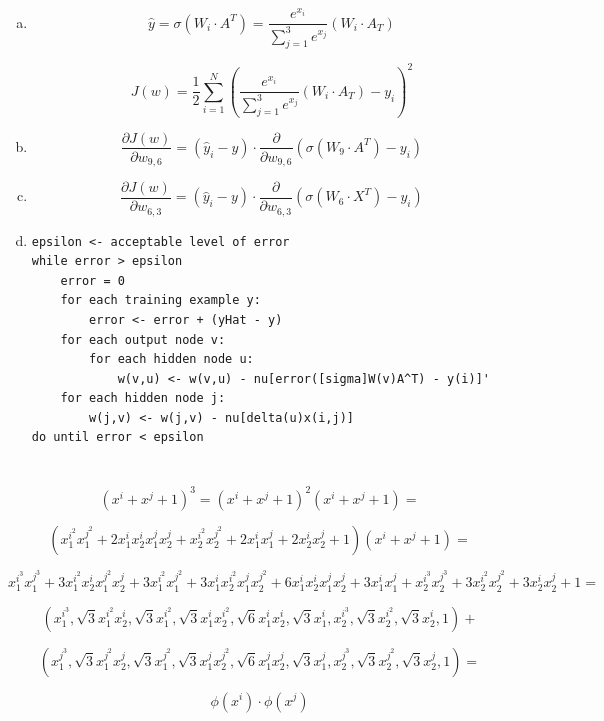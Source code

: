 \documentclass{article}
\begin{document}
\section{}
\begin{enumerate}[(a)]
\item
\[
\hat{y} = \sigma(W_i \cdot A^T) = \frac{e^{x_i}}{\sum_{j=1}^{3}e^{x_j}}
(W_i \cdot A_T)
\]

\[
J(w) = \frac{1}{2}\sum_{i=1}^N(\frac{e^{x_i}}{\sum_{j=1}^{3}e^{x_j}}
(W_i \cdot A_T) - y_i)^2
\]

\item
\[
\frac{\partial J(w)}{\partial w_{9,6}} =
(\hat y_i - y) \cdot \frac{\partial}{\partial w_{9,6}}
(\sigma(W_9 \cdot A^T) - y_i)
\]

\item
\[
\frac{\partial J(w)}{\partial w_{6,3}} =
(\hat y_i - y) \cdot \frac{\partial}{\partial w_{6,3}}
(\sigma(W_6 \cdot X^T) - y_i)
\]

\item
\begin{verbatim}
epsilon <- acceptable level of error
while error > epsilon
    error = 0
    for each training example y:
        error <- error + (yHat - y)
    for each output node v:
        for each hidden node u:
            w(v,u) <- w(v,u) - nu[error([sigma]W(v)A^T) - y(i)]'
    for each hidden node j:
        w(j,v) <- w(j,v) - nu[delta(u)x(i,j)]
do until error < epsilon
\end{verbatim} 

\end{enumerate}
\section{}
\[
(x^i + x^j + 1)^3 = (x^i + x^j + 1)^2(x^i + x^j + 1) =
\]

\[
(x^{i^2}_1x^{j^2}_1 + 2x^i_1x^i_2x^j_1x^j_2+x^{i^2}_2 x^{j^2}_2+ 2x^i_1x^j_1 
+ 2x^i_2x^j_2 +1)(x^i + x^j + 1) =
\]

\[
x^{i^3}_1x^{j^3}_1 + 3x^{i^2}_1 x^i_2 x^{j^2}_1 x^j_2 + 3x^{i^2}_1x^{j^2}_1 +
3x^i_1 x^{i^2}_2 x^j_1 x^{j^2}_2 + 6 x^i_1 x^i_2 x^j_1 x^j_2 + 3 x^i_1 x^j_1
+ x^{i^3}_2x^{j^3}_2 + 3x^{i^2}_2x^{j^2}_2 + 3 x^i_2 x^j_2 + 1 = 
\]

\[
(x^{i^3}_1, \sqrt{3}x^{i^2}_1 x^i_2, \sqrt{3}x^{i^2}_1,
\sqrt{3}x^i_1 x^{i^2}_2, \sqrt{6} x^i_1 x^i_2, \sqrt{3} x^i_1,
x^{i^3}_2, \sqrt{3}x^{i^2}_2, \sqrt{3} x^i_2, 1) +
\]

\[
(x^{j^3}_1, \sqrt{3}x^{j^2}_1 x^j_2, \sqrt{3}x^{j^2}_1,
\sqrt{3}x^j_1 x^{j^2}_2, \sqrt{6} x^j_1 x^j_2, \sqrt{3} x^j_1,
x^{j^3}_2, \sqrt{3}x^{j^2}_2, \sqrt{3} x^j_2, 1) = 
\]

\[
\phi(x^i) \cdot \phi(x^j)
\]
\end{document}

